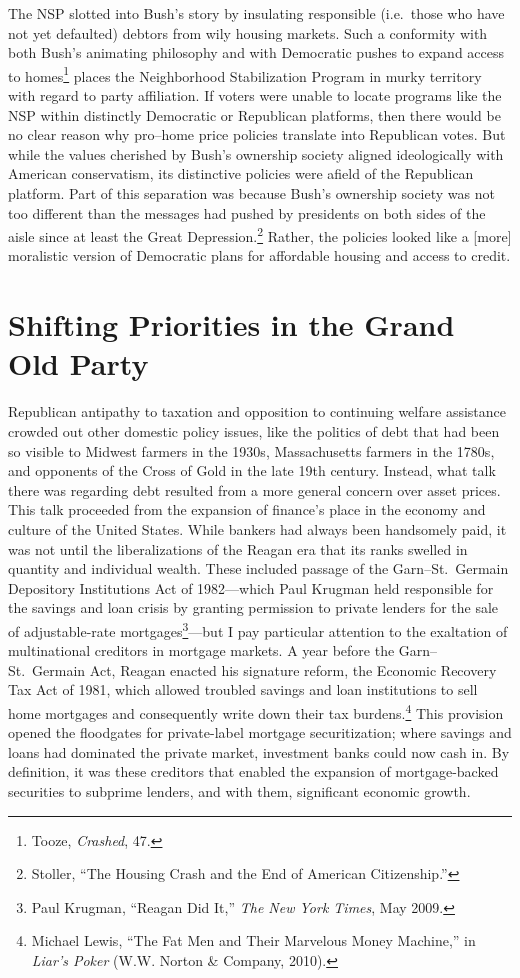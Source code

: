 \documentclass[12pt,oneside]{psthesis}
\begin{document}
The NSP slotted into Bush's story by insulating responsible (i.e.~those who have not yet defaulted) debtors from wily housing markets.
Such a conformity with both Bush's animating philosophy and with Democratic pushes to expand access to homes\footnote{Tooze, \emph{Crashed}, 47.} places the Neighborhood Stabilization Program in murky territory with regard to party affiliation.
If voters were unable to locate programs like the NSP within distinctly Democratic or Republican platforms, then there would be no clear reason why pro--home price policies translate into Republican votes.
But while the values cherished by Bush's ownership society aligned ideologically with American conservatism, its distinctive policies were afield of the Republican platform.
Part of this separation was because Bush's ownership society was not too different than the messages had pushed by presidents on both sides of the aisle since at least the Great Depression.\footnote{Stoller, ``The Housing Crash and the End of American Citizenship.''}
Rather, the policies looked like a {[}more{]} moralistic version of Democratic plans for affordable housing and access to credit.

\hypertarget{shifting-priorities-in-the-grand-old-party}{%
\section{Shifting Priorities in the Grand Old Party}\label{shifting-priorities-in-the-grand-old-party}}

Republican antipathy to taxation and opposition to continuing welfare assistance crowded out other domestic policy issues, like the politics of debt that had been so visible to Midwest farmers in the 1930s, Massachusetts farmers in the 1780s, and opponents of the Cross of Gold in the late 19th century.
Instead, what talk there was regarding debt resulted from a more general concern over asset prices.
This talk proceeded from the expansion of finance's place in the economy and culture of the United States.
While bankers had always been handsomely paid, it was not until the liberalizations of the Reagan era that its ranks swelled in quantity and individual wealth.
These included passage of the Garn--St.~Germain Depository Institutions Act of 1982---which Paul Krugman held responsible for the savings and loan crisis by granting permission to private lenders for the sale of adjustable-rate mortgages\footnote{Paul Krugman, ``Reagan Did It,'' \emph{The New York Times}, May 2009.}---but I pay particular attention to the exaltation of multinational creditors in mortgage markets.
A year before the Garn--St.~Germain Act, Reagan enacted his signature reform, the Economic Recovery Tax Act of 1981, which allowed troubled savings and loan institutions to sell home mortgages and consequently write down their tax burdens.\footnote{Michael Lewis, ``The Fat Men and Their Marvelous Money Machine,'' in \emph{Liar's Poker} (W.W. Norton \& Company, 2010).}
This provision opened the floodgates for private-label mortgage securitization; where savings and loans had dominated the private market, investment banks could now cash in.
By definition, it was these creditors that enabled the expansion of mortgage-backed securities to subprime lenders, and with them, significant economic growth.
\end{document}
